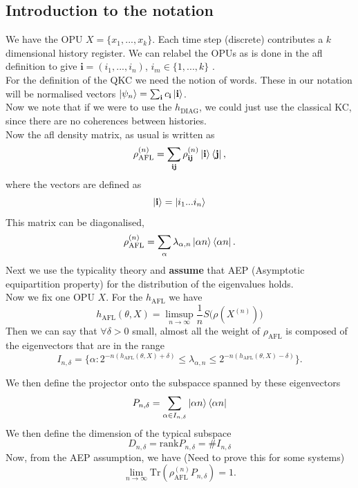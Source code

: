 \documentclass{article}
\newcommand{\afl}{h_{\text{AFL}}}
\newcommand{\diag}{h_{\text{DIAG}}}
\newcommand{\rafl}{\rho_{\text{AFL}}}
\begin{document}
\subsection{Introduction to the notation}
We have the OPU $X = \{x_1,...,x_k\}$. Each time step (discrete) contributes a $k$ dimensional history register. We can relabel the OPUs as is done in the afl definition to give $\mathbf{i} = (i_1,...,i_n)$, $i_m \in \{1,...,k\}$ . \\
For the definition of the QKC we need the notion of words. These in our notation will be normalised vectors $\ket{\psi_n} = \sum_{\mathbf{i}}c_\mathbf{i}\ket{\mathbf{i}}$.\\
Now we note that if we were to use the $\diag$, we could just use the classical KC, since there are no coherences between histories. \\
Now the afl density matrix, as usual is written as 
\begin{equation}
    \rafl^{(n)} = \sum_{\mathbf{i}\mathbf{j}}\rho_{\mathbf{i}\mathbf{j}}^{(n)}\ket{\mathbf{i}}\bra{\mathbf{j}},
\end{equation}
where the vectors are defined as 
\begin{equation}
    \ket{\mathbf{i}} = \ket{i_1...i_n}
\end{equation}
This matrix can be diagonalised,
\begin{equation}
    \rafl^{(n)} = \sum_{\alpha}\lambda_{\alpha, n} \ket{\alpha n}\bra{\alpha n}.
\end{equation}
Next we use the typicality theory and \textbf{assume} that AEP (Asymptotic equipartition property) for the distribution of the eigenvalues holds.\\
Now we fix one OPU $X$. For the $\afl$ we have
\begin{equation}
    \afl (\theta, X) = \limsup_{n\to\infty}{\frac{1}{n}S(\rho(X^{(n)})})
\end{equation}
Then we can say that $\forall \delta > 0$ small, almost all the weight of $\rafl$ is composed of the eigenvectors that are in the range
\begin{equation}
    I_{n, \delta} = \{\alpha: 2^{-n(\afl(\theta, X)+\delta)} \leq \lambda_{\alpha, n} \leq2^{-n(\afl(\theta, X)-\delta)}\}.
\end{equation}

We then define the projector onto the subspacce spanned by these eigenvectors 
\begin{equation}
    P_{n,\delta} = \sum_{\alpha \in I_{n, \delta}} \ket{\alpha n} \bra{{\alpha n}}
\end{equation}
We then define the dimension of the typical subspace
\begin{equation}
    D_{n,\delta} = \text{rank}P_{n,\delta} = \#I_{n,\delta}
\end{equation}
Now, from the AEP assumption, we have (Need to prove this for some systems) 
\begin{equation}
    \lim_{n\to\infty}\text{Tr}(\rafl^{(n)}P_{n,\delta}) = 1.
\end{equation}
\end{document}
